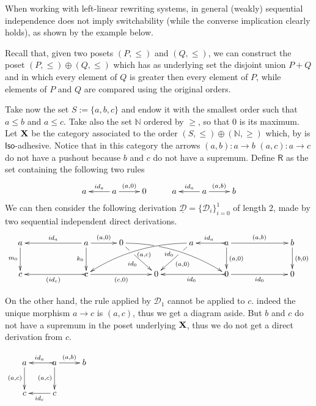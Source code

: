 \documentclass[a4paper,UKenglish,cleveref,pdftex, thm-restate,numberwithinsect]{lipics}
\newcommand{\id}[1]{\mathsf{id}_{#1}}
\def\R{\mathsf{R}}
\def\X{\textbf {\textup{X}}}
\newcommand{\dder}[1]{\mathscr{#1}}
\newcommand{\der}[1]{\underline{\dder{#1}}}
\newcommand{\rem}[2]{{\color{blue}#1}{\color{red}#2}}
\renewcommand{\rem}[2]{}
\begin{document}
When working with left-linear rewriting systems, in general (weakly) sequential independence does not imply switchability (while the converse implication clearly holds), as shown by the example below.


\rem{remove}{
  \begin{remark}
    \label{rem:fact}
    Notice that, since $f_{\der{E}, 0}$ is in $\mathcal{M}$, there is
    at most one $j_1\colon L_0\to D_{\der{E},0}$ such that
    $m_0=f_{\der{E}, 0} \circ j_1$. Moreover, we already know that
    there is at most one $j_0\colon R_1\to D_{\der{E},1}$ such that
    $m_{\der{E},1}=f_{\der{E},1}\circ j_0$, therefore, the
    independence pair $(j_0,j_1)$ between the component of a switch is
    uniquely determined.
\end{remark}
}



\begin{example}
  \label{ex:diff1}
  Recall that, given two posets $(P, \leq)$ and $(Q, \leq)$, we can
  construct the poset $(P, \leq)\oplus(Q,\leq)$ which has as
  underlying set the disjoint union $P+Q$ and in which every element
  of $Q$ is greater then every element of $P$, while elements of $P$
  and $Q$ are compared using the original orders.
	
  Take now the set $S:=\{a,b,c\}$ and endow it with the smallest order
  such that $a\leq b$ and $a\leq c$.  Take also the set $\mathbb{N}$
  ordered by $\geq$, so that $0$ is its maximum.  Let $\X$ be the
  category associated to the order
  $(S, \leq)\oplus (\mathbb{N}, \geq)$ which, by  is
  $\mathsf{Iso}$-adhesive. Notice that in this category the arrows
  $(a,b)\colon a\to b$ $(a,c)\colon a\to c$ do not have a pushout
  because $b$ and $c$ do not have a supremum.  Define $\R$ as the set
  containing the following two rules
  \[\xymatrix{a & a \ar[r]^{(a, 0)} \ar[l]_{\id{a}} & 0 & a & a \ar[r]^{(a, b)} \ar[l]_{\id{a}} & b  }\]
  We can then consider the following derivation
  $\der{D}=\{\dder{D}_i\}_{i=0}^1$ of length $2$, made by two
  sequential independent direct derivations.
  \[\xymatrix@C=30pt{a \ar[d]_{m_0}&& a \ar[d]_{k_0}\ar[ll]_{\id{a}} \ar[r]^{(a,0)} & 0 \ar@/^.35cm/[drrr]|(.315)\hole_(.45){\id{0}} \ar[dr]|(.3)\hole_{\id{0}} && a \ar@/_.35cm/[dlll]^(.45){(a,c)} \ar[dl]|(.3)\hole^{(a,0)}& a \ar[d]^{(a,0)}\ar@{>->}[l]_{\id{a}} \ar[rr]^{(a,b)} && b \ar[d]^{(b,0)}\\c && \ar@{>->}[ll]^{(\id{c})} c \ar[rr]_{(c,0)}&& 0  && \ar@{>->}[ll]^{\id{0}} 0 \ar[rr]_{\id{0}}&& 0}\]
	 	
  \noindent 
  \parbox{10cm}{ \hspace{15pt}On the other hand, the rule applied by
    $\dder{D}_1$ cannot be applied to $c$. indeed the unique morphism
    $a\to c$ is $(a,c)$, thus we get a diagram aside. But $b$ and $c$
    do not have a supremum in the poset underlying $\X$, thus we do
    not get a direct derivation from $c$.}  \parbox{3cm}{
    \vspace{-.3cm}$\xymatrix{a \ar[d]_{(a,c)}& a
      \ar[d]_{(a,c)}\ar@{>->}[l]_{\id{a}} \ar[r]^{(a,b)} & b \\c & c
      \ar[l]^{\id{c}} }$}
  
\end{example}
\end{document}
